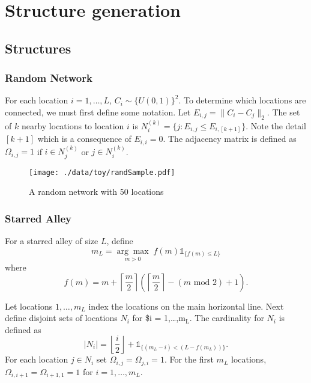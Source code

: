 \documentclass[11pt]{article}
\begin{document}
\section{Structure generation}
\label{sec-3}

\subsection{Structures}
\label{sec-3-1}

\subsubsection{Random Network}
\label{sec-3-1-1}

For each location $i=1,\ldots,L$, $C_i \sim \lbrace U(0,1)\rbrace^2$.
To determine which locations are connected, we must first define some
notation.  Let $E_{i,j} = \|C_{i} - C_{j}\|_2$.  The set of $k$ nearby
locations to location $i$ is $N^{(k)}_i = \lbrace j : E_{i,j} \le
    E_{i,[k+1]} \rbrace$.  Note the detail $[k+1]$ which is a consequence
of $E_{i,i} = 0$.  The adjacency matrix is defined as $\Omega_{i,j} =
    1$ if $i \in N_{j}^{(k)}$ or $j \in N_{i}^{(k)}$.


\begin{figure}[htb]
\centering
\texttt{[image: ./data/toy/randSample.pdf]}
\caption{\label{fig:rand50}A random network with 50 locations}
\end{figure}



\subsubsection{Starred Alley}
\label{sec-3-1-2}

For a starred alley of size $L$, define
\begin{equation*}
m_L= \underset{m > 0}{\arg\max} \; f(m) \mathds{1}_{\lbrace f(m) \le L
\rbrace }
\end{equation*}
where
\begin{equation*}
f(m) = m + \left\lceil \frac{m}{2}
\right\rceil 
\left(\left\lceil \frac{m}{2} \right\rceil
- (m \text{ mod } 2) + 1 \right).
\end{equation*}

Let locations $1,\ldots,m_L$ index the locations on the main
horizontal line.  Next define disjoint sets of locations
$N_i$ for \$i = 1,\ldots,m$_{\text{L}}$.  The cardinality for
$N_i$ is defined as
\begin{equation*}
| N_i | = \left\lfloor \frac{i}{2} \right\rfloor +
\mathds{1}_{\lbrace(m_L - i) < (L - f(m_L))\rbrace}.
\end{equation*}
For each location $j \in N_i$ set $\Omega_{i,j} = \Omega_{j,i} = 1$.
For the first $m_L$ locations, $\Omega_{i,i+1} = \Omega_{i+1,1} = 1$ for
$i = 1,\ldots,m_L$.
\end{document}
